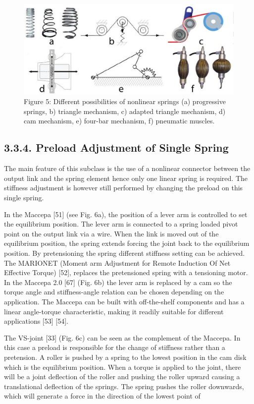 \documentclass[10pt]{article}
\begin{document}
\begin{figure}[h]
\begin{center}
  \includegraphics[width=\textwidth]{2025_09_17_f0417c8723605e4ad1efg-13}
\captionsetup{labelformat=empty}
\caption{Figure 5: Different possibilities of nonlinear springs (a) progressive springs, b) triangle mechanism, c) adapted triangle mechanism, d) cam mechanism, e) four-bar mechanism, f) pneumatic muscles.}
\end{center}
\end{figure}

\subsection*{3.3.4. Preload Adjustment of Single Spring}
The main feature of this subclass is the use of a nonlinear connector between the output link and the spring element hence only one linear spring is required. The stiffness adjustment is however still performed by changing the preload on this single spring.

In the Maccepa [51] (see Fig. 6a), the position of a lever arm is controlled to set the equilibrium position. The lever arm is connected to a spring loaded pivot point on the output link via a wire. When the link is moved out of the equilibrium position, the spring extends forcing the joint back to the equilibrium position. By pretensioning the spring different stiffness setting can be achieved. The MARIONET (Moment arm Adjustment for Remote Induction Of Net Effective Torque) [52], replaces the pretensioned spring with a tensioning motor. In the Maccepa 2.0 [67] (Fig. 6b) the lever arm is replaced by a cam so the torque angle and stiffness-angle relation can be chosen depending on the application. The Maccepa can be built with off-the-shelf components and has a linear angle-torque characteristic, making it readily suitable for different applications [53] [54].

The VS-joint [33] (Fig. 6c) can be seen as the complement of the Maccepa. In this case a preload is responsible for the change of stiffness rather than a pretension. A roller is pushed by a spring to the lowest position in the cam disk which is the equilibrium position. When a torque is applied to the joint, there will be a joint deflection of the roller and pushing the roller upward causing a translational deflection of the springs. The spring pushes the roller downwards, which will generate a force in the direction of the lowest point of
\end{document}
